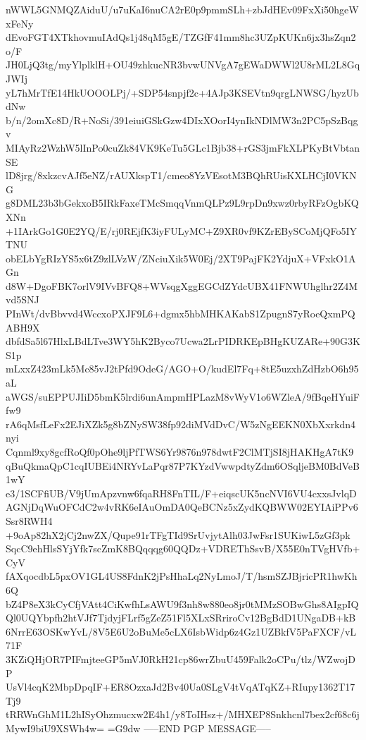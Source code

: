 nWWL5GNMQZAiduU/u7uKaI6nuCA2rE0p9pmmSLh+zbJdHEv09FxXi50hgeWxFeNy
dEvoFGT4XTkhovmuIAdQs1j48qM5gE/TZGfF41mm8hc3UZpKUKn6jx3hsZqn2o/F
JH0LjQ3tg/myYlplklH+OU49zhkucNR3bvwUNVgA7gEWaDWWl2U8rML2L8GqJWIj
yL7hMrTfE14HkUOOOLPj/+SDP54snpjf2c+4AJp3KSEVtn9qrgLNWSG/hyzUbdNw
b/n/2omXc8D/R+NoSi/391eiuiGSkGzw4DIxXOorI4ynIkNDlMW3n2PC5pSzBqgv
MIAyRz2WzhW5lInPo0cuZk84VK9KeTu5GLc1Bjb38+rGS3jmFkXLPKyBtVbtanSE
lD8jrg/8xkzcvAJf5eNZ/rAUXkspT1/cmeo8YzVEsotM3BQhRUisKXLHCjI0VKNG
g8DML23b3bGekxoB5IRkFaxeTMcSmqqVnmQLPz9L9rpDn9xwz0rbyRFzOgbKQXNn
+1IArkGo1G0E2YQ/E/rj0REjfK3iyFULyMC+Z9XR0vf9KZrEBySCoMjQFo5IYTNU
obELbYgRIzYS5x6tZ9zlLVzW/ZNciuXik5W0Ej/2XT9PajFK2YdjuX+VFxkO1AGn
d8W+DgoFBK7orlV9IVvBFQ8+WVsqgXggEGCdZYdcUBX41FNWUhglhr2Z4Mvd5SNJ
PInWt/dvBbvvd4WccxoPXJF9L6+dgmx5hbMHKAKabS1ZpugnS7yRoeQxmPQABH9X
dbfdSa5l67HlxLBdLTve3WY5hK2Byco7Ucwa2LrPIDRKEpBHgKUZARe+90G3KS1p
mLxxZ423mLk5Mc85vJ2tPfd9OdeG/AGO+O/kudEl7Fq+8tE5uzxhZdHzbO6h95aL
aWGS/suEPPUJIiD5bmK5lrdi6unAmpmHPLazM8vWyV1o6WZleA/9fBqeHYuiFfw9
rA6qMsfLeFx2EJiXZk5g8bZNySW38fp92diMVdDvC/W5zNgEEKN0XbXxrkdn4nyi
Cqnml9xy8gcfRoQf0pOhe9ljPfTWS6Yr9876n978dwtF2ClMTjSI8jHAKHgA7tK9
qBuQkmaQpC1cqIUBEi4NRYvLaPqr87P7KYzdVwwpdtyZdm6OSqljeBM0BdVeB1wY
e3/1SCFfiUB/V9jUmApzvnw6fqaRH8FnTIL/F+eiqscUK5ncNVI6VU4cxxsJvlqD
AGNjDqWuOFCdC2w4vRK6eIAuOmDA0QeBCNz5xZydKQBWW02EYIAiPPv6Ssr8RWH4
+9oAp82hX2jCj2nwZX/Qupe91rTFgTId9SrUvjytAlh03JwFsr1SUKiwL5zGf3pk
SqcC9ehHlsSYjYfk7scZmK8BQqqqg60QQDz+VDREThSsvB/X55E0nTVgHVfb+CyV
fAXqocdbL5pxOV1GL4US8FdnK2jPsHhaLq2NyLmoJ/T/hsmSZJBjricPR1hwKh6Q
bZ4P8eX3kCyCfjVAtt4CiKwfhLsAWU9f3nh8w880eo8jr0tMMzSOBwGhs8AIgpIQ
Ql0UQYbpfh2htVJf7TjdyjFLrf5gZeZ51Fl5XLxSRriroCv12BgBdD1UNgaDB+kB
6NrrE63OSKwYvL/8V5E6U2oBuMe5cLX6IsbWidp6z4Gz1UZBkfV5PaFXCF/vL71F
3KZiQHjOR7PIFmjteeGP5mVJ0RkH21cp86wrZbuU459Falk2oCPu/tlz/WZwojDP
UsVl4cqK2MbpDpqIF+ER8OzxaJd2Bv40Ua0SLgV4tVqATqKZ+RIupy1362T17Tj9
tRRWnGhM1L2hISyOhzmucxw2E4h1/y8ToIHsz+/MHXEP8Snkhcnl7bex2cf68c6j
MywI9biU9XSWh4w=
=G9dw
-----END PGP MESSAGE-----
